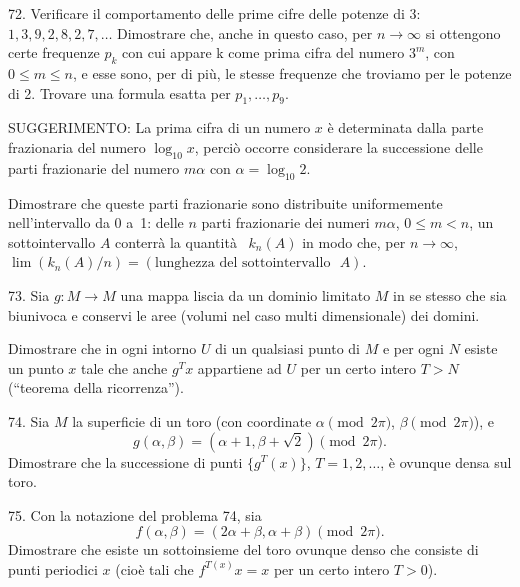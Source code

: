 \begin{problem}{72.}
	Verificare il comportamento delle prime cifre delle potenze di 3: $1,
	3, 9, 2, 8, 2, 7, \dotsc$ Dimostrare che, anche in questo caso, per $n \to \infty$
si ottengono certe frequenze $p_{k}$ con cui appare k come prima cifra del numero  $3^m$, con
	$0\leqslant m \leqslant n$, e esse sono, per di più, le stesse frequenze che troviamo per le potenze di 2. Trovare una formula esatta per $p_1, \dotsc, p_9$.

	\begin{note}{SUGGERIMENTO:}
		La prima cifra di un numero $x$ è determinata dalla parte frazionaria del numero $\log_{10} x$, perciò occorre considerare la successione delle parti frazionarie del numero          $m \alpha$ con $\alpha=\log_{10} 2$.
	\end{note}
	Dimostrare che queste parti frazionarie sono distribuite uniformemente nell’intervallo da 0 a~1: delle $n$ parti frazionarie dei numeri $m \alpha$, $0 \leqslant m<n$,
	un sottointervallo $A$ conterrà la quantità ~$k_n (A)$ in modo che, per $n \to \infty$,
	$\lim (k_n (A)/n)=(\text{lunghezza del sottointervallo ~$A$})$.
\end{problem}

\begin{problem}{73.}
	Sia $g\colon M \to M$ una mappa liscia da un dominio limitato $M$ in se stesso che sia biunivoca e conservi le aree (volumi nel caso multi dimensionale) dei domini.

	Dimostrare che in ogni intorno $U$ di un qualsiasi punto di $M$ e per ogni $N$ esiste un punto $x$
	tale che anche $g^T x$ appartiene ad $U$ per un certo intero $T>N$ (\enquote{teorema della ricorrenza}).
\end{problem}

\begin{problem}{74.}
	Sia $M$ la superficie di un toro (con coordinate $\alpha \pmod{2\pi}$, $\beta \pmod{2\pi}$),
	e
	\begin{equation*}
		g(\alpha, \beta)=(\alpha+1, \beta+ \sqrt{2}) \pmod{2\pi}.
	\end{equation*}
	Dimostrare che la successione di punti
	$\{g^T (x)\}$, $T=1, 2, \dotsc$, è ovunque densa sul toro.
\end{problem}

\begin{problem}{75.}
	Con la notazione del problema 74, sia
	\begin{equation*}
		f(\alpha, \beta)=(2\alpha+\beta,\alpha+\beta) \pmod{2\pi}.
	\end{equation*}
	Dimostrare che esiste un sottoinsieme del toro ovunque denso che consiste di punti periodici  $x$ (cioè tali che
	$f^{T (x)} x=x$ per un certo intero $T>0$).
\end{problem}


